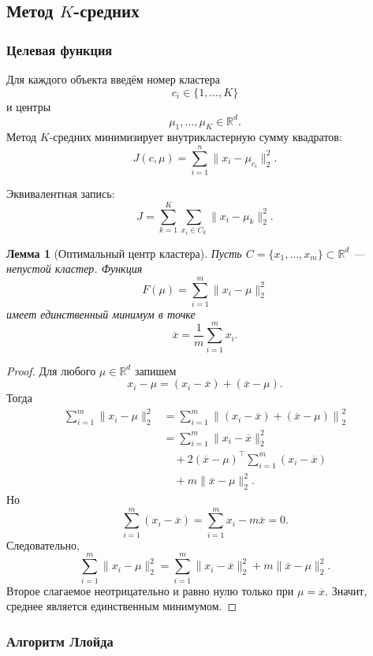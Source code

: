 \documentclass[12pt,a4paper]{article}
\newtheorem{lemma}[theorem]{Лемма}
\theoremstyle{definition}
\theoremstyle{remark}
\newcommand{\R}{\mathbb{R}}
\begin{document}
\subsection{Метод $K$-средних}

\subsubsection{Целевая функция}

Для каждого объекта введём номер кластера
\[
    c_i\in\{1,\ldots,K\}
\]
и центры
\[
    \mu_1,\ldots,\mu_K\in\R^d.
\]
Метод $K$-средних минимизирует внутрикластерную сумму квадратов:
\[
    J(c,\mu)
    =
    \sum_{i=1}^{n}
    \|x_i-\mu_{c_i}\|_2^2.
\]

Эквивалентная запись:
\[
    J
    =
    \sum_{k=1}^{K}
    \sum_{x_i\in C_k}
    \|x_i-\mu_k\|_2^2.
\]

\begin{lemma}[Оптимальный центр кластера]
Пусть $C=\{x_1,\ldots,x_m\}\subset\R^d$ --- непустой кластер.
Функция
\[
    F(\mu)=\sum_{i=1}^{m}\|x_i-\mu\|_2^2
\]
имеет единственный минимум в точке
\[
    \overline x
    =
    \frac{1}{m}\sum_{i=1}^{m}x_i.
\]
\end{lemma}

\begin{proof}
Для любого $\mu\in\R^d$ запишем
\[
    x_i-\mu
    =
    (x_i-\overline x)+(\overline x-\mu).
\]
Тогда
\[
\begin{split}
    \sum_{i=1}^{m}\|x_i-\mu\|_2^2
    &=
    \sum_{i=1}^{m}
    \left\|
        (x_i-\overline x)+(\overline x-\mu)
    \right\|_2^2\\
    &=
    \sum_{i=1}^{m}\|x_i-\overline x\|_2^2\\
    &\quad+
    2(\overline x-\mu)^\top
    \sum_{i=1}^{m}(x_i-\overline x)\\
    &\quad+
    m\|\overline x-\mu\|_2^2.
\end{split}
\]
Но
\[
    \sum_{i=1}^{m}(x_i-\overline x)
    =
    \sum_{i=1}^{m}x_i-m\overline x
    =
    0.
\]
Следовательно,
\[
    \sum_{i=1}^{m}\|x_i-\mu\|_2^2
    =
    \sum_{i=1}^{m}\|x_i-\overline x\|_2^2
    +
    m\|\overline x-\mu\|_2^2.
\]
Второе слагаемое неотрицательно и равно нулю только при
$\mu=\overline x$. Значит, среднее является единственным минимумом.
\end{proof}

\subsubsection{Алгоритм Ллойда}
\end{document}
